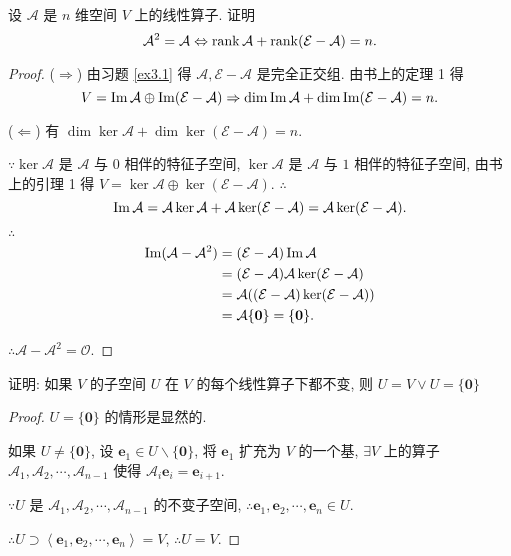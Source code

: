 \documentclass[color=black,device=normal,lang=cn,mode=geye]{elegantnote}
\begin{document}
\begin{exercise}%
    设 $\mathcal{A}$ 是 $n$ 维空间 $V$ 上的线性算子. 证明
    \[\mathcal{A}^2=\mathcal{A}\Leftrightarrow\operatorname{rank}\mathcal{A}+\operatorname{rank}(\mathcal{E}-\mathcal{A})=n.\]
\end{exercise}
\begin{proof}
    ($\Rightarrow$) 由习题 \ref{ex3.1} 得 $\mathcal{A},\mathcal{E}-\mathcal{A}$ 是完全正交组. 由书上的定理 1 得
    \[V=\operatorname{Im}\mathcal{A}\oplus\operatorname{Im}(\mathcal{E}-\mathcal{A})\Rightarrow\dim\operatorname{Im}\mathcal{A}+\dim\operatorname{Im}(\mathcal{E}-\mathcal{A})=n.\]

    ($\Leftarrow$) 有 $\dim\ker\mathcal{A}+\dim\ker(\mathcal{E}-\mathcal{A})=n$.

    $\because\ker\mathcal{A}$ 是 $\mathcal{A}$ 与 $0$ 相伴的特征子空间, $\ker\mathcal{A}$ 是 $\mathcal{A}$ 与 $1$ 相伴的特征子空间, 由书上的引理 1 得 $V=\ker\mathcal{A}\oplus\ker(\mathcal{E}-\mathcal{A})$. $\therefore$
    \[\operatorname{Im}\mathcal{A}=\mathcal{A}\ker\mathcal{A}+\mathcal{A}\ker(\mathcal{E}-\mathcal{A})=\mathcal{A}\ker(\mathcal{E}-\mathcal{A}).\]

    $\therefore$
    \begin{align*}
        \operatorname{Im}(\mathcal{A}-\mathcal{A}^2) & =(\mathcal{E}-\mathcal{A})\operatorname{Im}\mathcal{A} \\
        & =(\mathcal{E}-\mathcal{A})\mathcal{A}\ker(\mathcal{E}-\mathcal{A}) \\
        & =\mathcal{A}((\mathcal{E}-\mathcal{A})\ker(\mathcal{E}-\mathcal{A})) \\
        & =\mathcal{A}\{\boldsymbol{0}\}=\{\boldsymbol{0}\}.
    \end{align*}

    $\therefore\mathcal{A}-\mathcal{A}^2=\mathcal{O}$.
\end{proof}
\begin{exercisec}[2.3.2]
    证明: 如果 $V$ 的子空间 $U$ 在 $V$ 的每个线性算子下都不变, 则 $U=V\vee U=\{\boldsymbol{0}\}$
\end{exercisec}
\begin{proof}
    $U=\{\boldsymbol{0}\}$ 的情形是显然的.
    
    如果 $U\neq\{\boldsymbol{0}\}$, 设 $\boldsymbol{e}_1\in U\backslash\{\boldsymbol{0}\}$, 将 $\boldsymbol{e}_1$ 扩充为 $V$ 的一个基, $\exists V$ 上的算子 $\mathcal{A}_1,\mathcal{A}_2,\cdots,\mathcal{A}_{n-1}$ 使得 $\mathcal{A}_i\boldsymbol{e}_i=\boldsymbol{e}_{i+1}$.

    $\because U$ 是 $\mathcal{A}_1,\mathcal{A}_2,\cdots,\mathcal{A}_{n-1}$ 的不变子空间, $\therefore\boldsymbol{e}_1,\boldsymbol{e}_2,\cdots,\boldsymbol{e}_n\in U$.
    
    $\therefore U\supset\left<\boldsymbol{e}_1,\boldsymbol{e}_2,\cdots,\boldsymbol{e}_n\right>=V$, $\therefore U=V$.
\end{proof}
\end{document}
